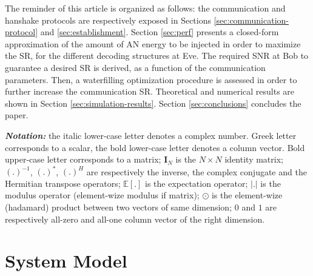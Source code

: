 \documentclass[12pt, draftclsnofoot, onecolumn]{IEEEtran}
\newcommand{\module}[1]{\left|#1\right|}
\newcommand{\EX}[1]{\mathbb{E} \left[#1\right]}%
\newcommand{\vect}[1]{\boldsymbol{\mathrm{#1}}}
\begin{document}
The reminder of this article is organized as follows: the communication and hanshake protocols are respectively exposed in Sections \ref{sec:communication-protocol} and \ref{sec:establishment}. Section \ref{sec:perf} presents a closed-form approximation of the amount of AN energy to be injected in order to maximize the SR, for the different decoding structures at Eve. The required SNR at Bob to guarantee a desired SR is derived, as a function of the communication parameters. Then, a waterfilling optimization procedure is assessed in order to further increase the communication SR. Theoretical and numerical results are shown in Section \ref{sec:simulation-results}. Section \ref{sec:conclusions} concludes the paper.

\textit{\textbf{Notation:}} the italic lower-case letter denotes a complex number. Greek letter corresponds to a scalar, the bold lower-case letter denotes a column vector. Bold upper-case letter corresponds to a matrix; $\textbf{I}_N$ is the $N \times N$ identity matrix; $(.)^{-1}$, $(.)^{*}$, $(.)^{H}$ are respectively the inverse, the complex conjugate and the Hermitian transpose operators; $\EX{.}$ is the expectation operator; $\module{.}$ is the modulus operator (element-wize modulus if matrix); $\odot$ is the element-wize (hadamard) product between two vectors of same dimension; $\vect{0}$ and $\vect{1}$ are respectively all-zero and all-one column vector of the right dimension.







\section{System Model}\label{sec:system-model}
\end{document}
